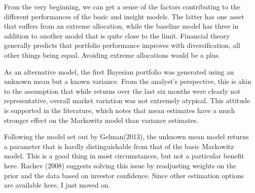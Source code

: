 \documentclass[a4paper]{article}\usepackage[]{graphicx}\usepackage[]{color}
\begin{document}
\begin{table}[ht]
\centering
{}
\caption{Asset allocations for each of the portfolios in this project. The final three portfolios use Bayesian methods.} 
\label{tab:weights}
\end{table}


From the very beginning, we can get a sense of the factors contributing to the different performances of the basic and insight models. The latter has one asset that suffers from an extreme allocation, while the baseline model has three in addition to another model that is quite close to the limit. Financial theory generally predicts that portfolio performance improves with diversification, all other things being equal. Avoiding extreme allocations would be a plus.

As an alternative model, the first Bayesian portfolio was generated using an unknown mean but a known variance. From the analyst's perspective, this is akin to the assumption that while returns over the last six months were clearly not representative, overall market variation was not extremely atypical. This attitude is supported in the literature, which notes that mean estimates have a much stronger effect on the Markowitz model than variance estimates.

Following the model set out by Gelman(2013), \cite{gelman13} the unknown mean model returns a parameter that is hardly distinguishable from that of the basic Markowitz model. This is a good thing in most circumstances, but not a particular benefit here. Rachev (2008) suggests solving this issue by readjusting weights on the prior and the data based on investor confidence. \cite{rachev08} Since other estimation options are available here, I just moved on.
\end{document}
